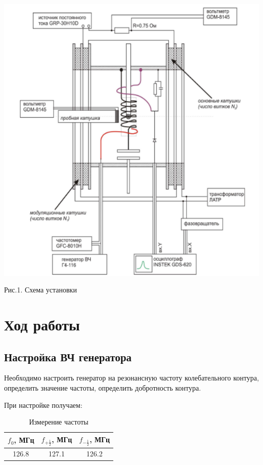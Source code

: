 \documentclass[14pt,a4paper]{scrartcl}
\begin{document}
\begin{center}
\includegraphics[scale=0.6]{Установка.png}\newline
\caption{Рис.1. Схема установки}
\end{center}


\section{Ход работы}

\subsection{Настройка ВЧ генератора}

Необходимо настроить генератор на резонансную частоту колебательного контура, определить значение частоты, определить добротность контура.

При настройке получаем:

\begin{table}[h]
    \centering
    \begin{tabular}{|c|c|c|}
    \hline
        $f_0$, МГц & $f_{+\frac{1}{2}}$, МГц & $f_{-\frac{1}{2}}$, МГц\\ \hline
        126.8 & 127.1 & 126.2 \\ \hline
    \end{tabular}
    \caption{Измерение частоты}
\end{table}
\end{document}
